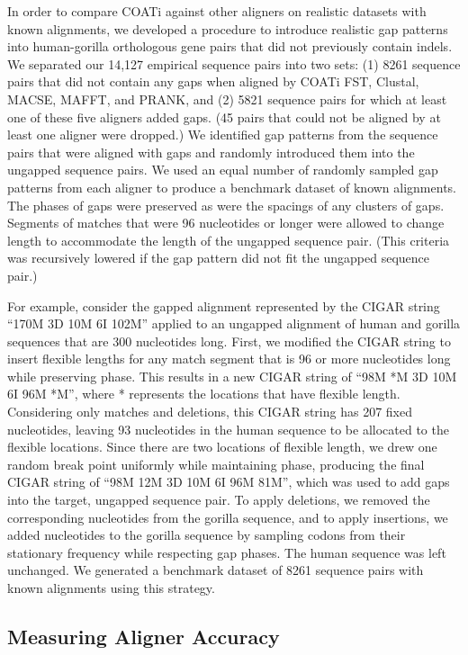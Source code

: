 \documentclass[12pt,letterpaper]{article}
\begin{document}
In order to compare COATi against other aligners on realistic datasets with known alignments, we developed a procedure to introduce realistic gap patterns into human-gorilla orthologous gene pairs that did not previously contain indels. We separated our 14,127 empirical sequence pairs into two sets: %
(1) 8261 sequence pairs that did not contain any gaps when aligned by COATi FST, Clustal\textOmega{}, MACSE, MAFFT, and PRANK, and (2) 5821 sequence pairs for which at least one of these five aligners added gaps.
(45 pairs that could not be aligned by at least one aligner were dropped.) We identified gap patterns from the sequence pairs that were aligned with gaps and randomly introduced them into the ungapped sequence pairs. We used an equal number of randomly sampled gap patterns from each aligner to produce a benchmark dataset of known alignments. The phases of gaps were preserved as were the spacings of any clusters of gaps. Segments of matches that were 96 nucleotides or longer were allowed to change length to accommodate the length of the ungapped sequence pair. (This criteria was recursively lowered if the gap pattern did not fit the ungapped sequence pair.)

For example, consider the gapped alignment represented by the CIGAR string
%
``170M 3D 10M 6I 102M'' %
%
applied to an ungapped alignment of human and gorilla sequences that are 300 nucleotides long. First, we modified the CIGAR string to insert flexible lengths for any match segment that is 96 or more nucleotides long while preserving phase. This results in a new CIGAR string of
%
``98M *M 3D 10M 6I 96M *M'',
%
where * represents the locations that have flexible length. Considering only matches and deletions, this CIGAR string has 207 fixed nucleotides, leaving 93 nucleotides in the human sequence to be allocated to the flexible locations. Since there are two locations of flexible length, we drew one random break point uniformly while maintaining phase, producing the final CIGAR string of
%
``98M 12M 3D 10M 6I 96M 81M'',
%
which was used to add gaps into the target, ungapped sequence pair.
To apply deletions, we removed the corresponding nucleotides from the gorilla sequence, and to apply insertions, we added nucleotides to the gorilla sequence by sampling codons from their stationary frequency while respecting gap phases. The human sequence was left unchanged.
%
We generated a benchmark dataset of 8261 sequence pairs with known alignments using this strategy.

\subsection*{Measuring Aligner Accuracy}
\end{document}
